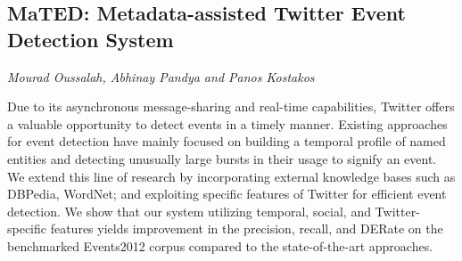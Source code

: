 \documentclass[../booklet.tex]{subfiles}
\begin{document}
\subsection[MaTED: Metadata-assisted Twitter Event Detection System. {\it Mourad Oussalah, Abhinay Pandya and Panos Kostakos}]{MaTED: Metadata-assisted Twitter Event Detection System}
  

\begin{center}
  {\it Mourad Oussalah, Abhinay Pandya and Panos Kostakos}
\end{center}



Due to its asynchronous message-sharing and real-time capabilities, Twitter offers a valuable opportunity to detect events in a timely manner. Existing approaches for event detection have mainly focused on building a temporal profile of named entities and detecting unusually large bursts in their usage to signify an event. We extend this line of research by incorporating external knowledge bases such as DBPedia, WordNet; and exploiting specific features of Twitter for efficient event detection. We show that our system utilizing temporal, social, and Twitter-specific features yields improvement in the precision, recall, and DERate on the benchmarked Events2012 corpus compared to the state-of-the-art approaches.

\end{document}
